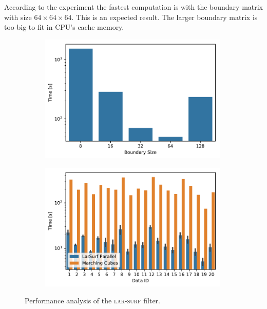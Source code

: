 According to the experiment the fastest computation is with the boundary matrix with size $64\times64\times64$. This is an expected result. The larger boundary matrix is too big to fit in CPU's cache memory.

\begin{figure}
\centering
\begin{subfigure}{0.495\textwidth}
\includegraphics[width=0.99\textwidth]{figs/bm_size_tesla.pdf} 
\label{fig:bm_size_tesla}
\end{subfigure}
\begin{subfigure}{0.495\textwidth}

\includegraphics[width=0.99\textwidth]{figs/ircad_comparison.pdf} 
\label{fig:ircad_comparison}
\end{subfigure}
\caption{Performance analysis of the \textsc{lar-surf} filter.}

\end{figure}


